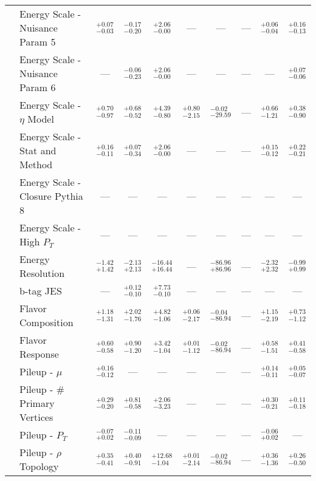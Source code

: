 \begin{tabular}{|cl||cccccc|c||c|}
\cline{2-10}
&Energy Scale - Nuisance Param 5 &  $^{+0.07}_{-0.03}$  &  $^{-0.17}_{-0.20}$  &  $^{+2.06}_{-0.00}$  & --- & --- & --- &  $^{+0.06}_{-0.04}$  &  $^{+0.16}_{-0.13}$ \\ 
\cline{2-10}
&Energy Scale - Nuisance Param 6 & --- &  $^{-0.06}_{-0.23}$  &  $^{+2.06}_{-0.00}$  & --- & --- & --- & --- &  $^{+0.07}_{-0.06}$ \\ 
\cline{2-10}
&Energy Scale - $\eta$ Model &  $^{+0.70}_{-0.97}$  &  $^{+0.68}_{-0.52}$  &  $^{+4.39}_{-0.80}$  &  $^{+0.80}_{-2.15}$  &  $^{-0.02}_{-29.59}$  & --- &  $^{+0.66}_{-1.21}$  &  $^{+0.38}_{-0.90}$ \\ 
\cline{2-10}
&Energy Scale - Stat and Method &  $^{+0.16}_{-0.11}$  &  $^{+0.07}_{-0.34}$  &  $^{+2.06}_{-0.00}$  & --- & --- & --- &  $^{+0.15}_{-0.12}$  &  $^{+0.22}_{-0.21}$ \\ 
\cline{2-10}
&Energy Scale - Closure Pythia 8 & --- & --- & --- & --- & --- & --- & --- & ---\\ 
\cline{2-10}
&Energy Scale - High $P_{T}$ & --- & --- & --- & --- & --- & --- & --- & ---\\ 
\cline{2-10}
&Energy Resolution &  $^{-1.42}_{+1.42}$  &  $^{-2.13}_{+2.13}$  &  $^{-16.44}_{+16.44}$  & --- &  $^{-86.96}_{+86.96}$  & --- &  $^{-2.32}_{+2.32}$  &  $^{-0.99}_{+0.99}$ \\ 
\cline{2-10}
&b-tag JES & --- &  $^{+0.12}_{-0.10}$  &  $^{+7.73}_{-0.10}$  & --- & --- & --- & --- & ---\\ 
\cline{2-10}
&Flavor Composition &  $^{+1.18}_{-1.31}$  &  $^{+2.02}_{-1.76}$  &  $^{+4.82}_{-1.06}$  &  $^{+0.06}_{-2.17}$  &  $^{-0.04}_{-86.94}$  & --- &  $^{+1.15}_{-2.19}$  &  $^{+0.73}_{-1.12}$ \\ 
\cline{2-10}
&Flavor Response &  $^{+0.60}_{-0.58}$  &  $^{+0.90}_{-1.20}$  &  $^{+3.42}_{-1.04}$  &  $^{+0.01}_{-1.12}$  &  $^{-0.02}_{-86.94}$  & --- &  $^{+0.58}_{-1.51}$  &  $^{+0.41}_{-0.58}$ \\ 
\cline{2-10}
&Pileup - $\mu$ &  $^{+0.16}_{-0.12}$  & --- & --- & --- & --- & --- &  $^{+0.14}_{-0.11}$  &  $^{+0.05}_{-0.07}$ \\ 
\cline{2-10}
&Pileup - \# Primary Vertices &  $^{+0.29}_{-0.20}$  &  $^{+0.81}_{-0.58}$  &  $^{+2.06}_{-3.23}$  & --- & --- & --- &  $^{+0.30}_{-0.21}$  &  $^{+0.11}_{-0.18}$ \\ 
\cline{2-10}
&Pileup -  $P_{T}$ &  $^{-0.07}_{+0.02}$  &  $^{-0.11}_{-0.09}$  & --- & --- & --- & --- &  $^{-0.06}_{+0.02}$  & ---\\ 
\cline{2-10}
&Pileup - $\rho$ Topology &  $^{+0.35}_{-0.41}$  &  $^{+0.40}_{-0.91}$  &  $^{+12.68}_{-1.04}$  &  $^{+0.01}_{-2.14}$  &  $^{-0.02}_{-86.94}$  & --- &  $^{+0.36}_{-1.36}$  &  $^{+0.26}_{-0.50}$ \\ 

\end{tabular}
